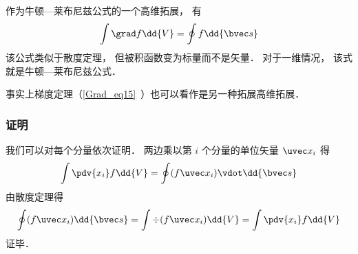 

作为牛顿—莱布尼兹公式的一个高维拓展， 有
\begin{equation}\label{NLext_eq3}
\int \grad f \dd{V} = \oint f \dd{\bvec s}
\end{equation}
该公式类似于散度定理， 但被积函数变为标量而不是矢量． 对于一维情况， 该式就是牛顿—莱布尼兹公式．

事实上梯度定理（\autoref{Grad_eq15}~）也可以看作是另一种拓展高维拓展． 

\subsubsection{证明}
我们可以对每个分量依次证明． 两边乘以第 $i$ 个分量的单位矢量 $\uvec x_i$ 得
\begin{equation}
\int \pdv{x_i}f \dd{V} = \oint (f\uvec x_i) \vdot \dd{\bvec s}
\end{equation}
由散度定理得
\begin{equation}
\oint (f\uvec x_i) \dd{\bvec s} = \int \div (f\uvec x_i) \dd{V} = \int \pdv{x_i} f \dd{V}
\end{equation}
证毕．
